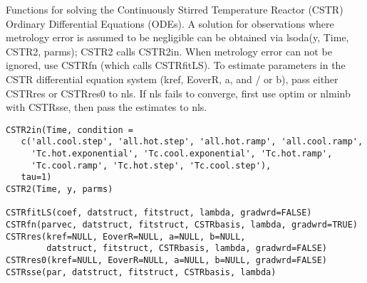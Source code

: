 \begin{Description}\relax
Functions for solving the Continuously Stirred Temperature Reactor
(CSTR) Ordinary Differential Equations (ODEs).  A solution for
observations where metrology error is assumed to be negligible can be 
obtained via lsoda(y, Time, CSTR2, parms);  CSTR2 calls CSTR2in.  When
metrology error can not be ignored, use CSTRfn (which calls
CSTRfitLS).  To estimate parameters in the CSTR differential equation
system (kref, EoverR, a, and / or b), pass either CSTRres or CSTRres0
to nls.  If nls fails to converge, first use optim or nlminb with
CSTRsse, then pass the estimates to nls.
\end{Description}
\begin{Usage}
\begin{verbatim}
CSTR2in(Time, condition =
   c('all.cool.step', 'all.hot.step', 'all.hot.ramp', 'all.cool.ramp',
     'Tc.hot.exponential', 'Tc.cool.exponential', 'Tc.hot.ramp',
     'Tc.cool.ramp', 'Tc.hot.step', 'Tc.cool.step'),
   tau=1)
CSTR2(Time, y, parms)  

CSTRfitLS(coef, datstruct, fitstruct, lambda, gradwrd=FALSE)
CSTRfn(parvec, datstruct, fitstruct, CSTRbasis, lambda, gradwrd=TRUE)
CSTRres(kref=NULL, EoverR=NULL, a=NULL, b=NULL,
        datstruct, fitstruct, CSTRbasis, lambda, gradwrd=FALSE)
CSTRres0(kref=NULL, EoverR=NULL, a=NULL, b=NULL, gradwrd=FALSE)
CSTRsse(par, datstruct, fitstruct, CSTRbasis, lambda)

\end{verbatim}
\end{Usage}
